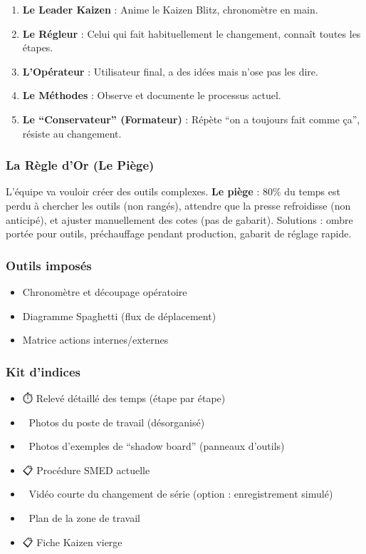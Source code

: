 \documentclass[
]{article}
\providecommand{\tightlist}{%
  \setlength{\itemsep}{0pt}\setlength{\parskip}{0pt}}
\begin{document}
\begin{enumerate}
\def\labelenumi{\arabic{enumi}.}
\tightlist
\item
  \textbf{Le Leader Kaizen} : Anime le Kaizen Blitz, chronomètre en
  main.
\item
  \textbf{Le Régleur} : Celui qui fait habituellement le changement,
  connaît toutes les étapes.
\item
  \textbf{L'Opérateur} : Utilisateur final, a des idées mais n'ose pas
  les dire.
\item
  \textbf{Le Méthodes} : Observe et documente le processus actuel.
\item
  \textbf{Le ``Conservateur'' (Formateur)} : Répète ``on a toujours fait
  comme ça'', résiste au changement.
\end{enumerate}

\subsubsection{La Règle d'Or (Le
Piège)}\label{la-ruxe8gle-dor-le-piuxe8ge-5}

L'équipe va vouloir créer des outils complexes. \textbf{Le piège} : 80\%
du temps est perdu à chercher les outils (non rangés), attendre que la
presse refroidisse (non anticipé), et ajuster manuellement des cotes
(pas de gabarit). Solutions : ombre portée pour outils, préchauffage
pendant production, gabarit de réglage rapide.

\subsubsection{Outils imposés}\label{outils-imposuxe9s-5}

\begin{itemize}
\tightlist
\item
  Chronomètre et découpage opératoire
\item
  Diagramme Spaghetti (flux de déplacement)
\item
  Matrice actions internes/externes
\end{itemize}

\subsubsection{Kit d'indices}\label{kit-dindices-5}

\begin{itemize}
\tightlist
\item
  ⏱️ Relevé détaillé des temps (étape par étape)
\item
  📸 Photos du poste de travail (désorganisé)
\item
  📸 Photos d'exemples de ``shadow board'' (panneaux d'outils)
\item
  📋 Procédure SMED actuelle
\item
  🎥 Vidéo courte du changement de série (option : enregistrement
  simulé)
\item
  📐 Plan de la zone de travail
\item
  📋 Fiche Kaizen vierge
\end{itemize}
\end{document}
